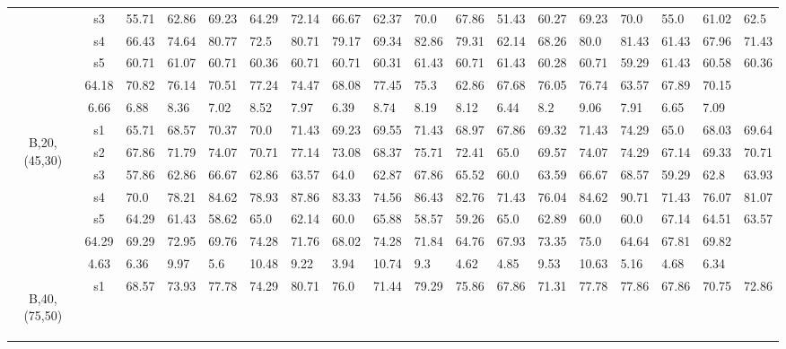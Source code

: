 \begin{table}[h]
{\begin{tabular}{cc|llll|llll|llll|llll}
 & s3 & 55.71 & 62.86 & 69.23 & 64.29 & 72.14 & 66.67 & 62.37 & 70.0 & 67.86 & 51.43 & 60.27 & 69.23 & 70.0 & 55.0 & 61.02 & 62.5 \\
 & s4 & 66.43 & 74.64 & 80.77 & 72.5 & 80.71 & 79.17 & 69.34 & 82.86 & 79.31 & 62.14 & 68.26 & 80.0 & 81.43 & 61.43 & 67.96 & 71.43 \\
 & s5 & 60.71 & 61.07 & 60.71 & 60.36 & 60.71 & 60.71 & 60.31 & 61.43 & 60.71 & 61.43 & 60.28 & 60.71 & 59.29 & 61.43 & 60.58 & 60.36 \\
\rowcolor{lightgray!50}\multicolumn{2}{r|}{avg} & 64.18 & 70.82 & 76.14 & 70.51 & 77.24 & 74.47 & 68.08 & 77.45 & 75.3 & 62.86 & 67.68 & 76.05 & 76.74 & 63.57 & 67.89 & 70.15 \\
\rowcolor{lightgray!50}\multicolumn{2}{r|}{std} & 6.66 & 6.88 & 8.36 & 7.02 & 8.52 & 7.97 & 6.39 & 8.74 & 8.19 & 8.12 & 6.44 & 8.2 & 9.06 & 7.91 & 6.65 & 7.09 \\
\multirow{6}{*}{\begin{sideways}B,20,(45,30)\end{sideways}} & s1 & 65.71 & 68.57 & 70.37 & 70.0 & 71.43 & 69.23 & 69.55 & 71.43 & 68.97 & 67.86 & 69.32 & 71.43 & 74.29 & 65.0 & 68.03 & 69.64 \\
 & s2 & 67.86 & 71.79 & 74.07 & 70.71 & 77.14 & 73.08 & 68.37 & 75.71 & 72.41 & 65.0 & 69.57 & 74.07 & 74.29 & 67.14 & 69.33 & 70.71 \\
 & s3 & 57.86 & 62.86 & 66.67 & 62.86 & 63.57 & 64.0 & 62.87 & 67.86 & 65.52 & 60.0 & 63.59 & 66.67 & 68.57 & 59.29 & 62.8 & 63.93 \\
 & s4 & 70.0 & 78.21 & 84.62 & 78.93 & 87.86 & 83.33 & 74.56 & 86.43 & 82.76 & 71.43 & 76.04 & 84.62 & 90.71 & 71.43 & 76.07 & 81.07 \\
 & s5 & 64.29 & 61.43 & 58.62 & 65.0 & 62.14 & 60.0 & 65.88 & 58.57 & 59.26 & 65.0 & 62.89 & 60.0 & 60.0 & 67.14 & 64.51 & 63.57 \\
\rowcolor{lightgray!50}\multicolumn{2}{r|}{avg} & 64.29 & 69.29 & 72.95 & 69.76 & 74.28 & 71.76 & 68.02 & 74.28 & 71.84 & 64.76 & 67.93 & 73.35 & 75.0 & 64.64 & 67.81 & 69.82 \\
\rowcolor{lightgray!50}\multicolumn{2}{r|}{std} & 4.63 & 6.36 & 9.97 & 5.6 & 10.48 & 9.22 & 3.94 & 10.74 & 9.3 & 4.62 & 4.85 & 9.53 & 10.63 & 5.16 & 4.68 & 6.34 \\
\multirow{6}{*}{\begin{sideways}B,40,(75,50)\end{sideways}} & s1 & 68.57 & 73.93 & 77.78 & 74.29 & 80.71 & 76.0 & 71.44 & 79.29 & 75.86 & 67.86 & 71.31 & 77.78 & 77.86 & 67.86 & 70.75 & 72.86 \\

\end{tabular}}
\end{table}
